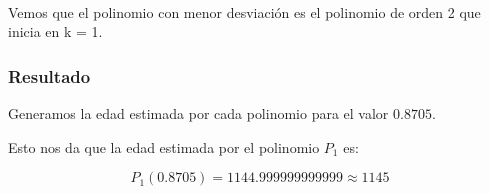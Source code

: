 \begin{table}[htbp]
	\centering
\end{table}


\paragraph{}
Vemos que el polinomio con menor desviación es el polinomio de orden 2 que inicia en k = 1. 


\subsubsection{Resultado}

Generamos la edad estimada por cada polinomio para el valor $0.8705$. 

\begin{table}[htbp]
	\centering
\end{table}

Esto nos da que la edad estimada por el polinomio $P_1$ es:

$$
	P_1(0.8705) = 1144.999999999999 \approx{1145}
$$


